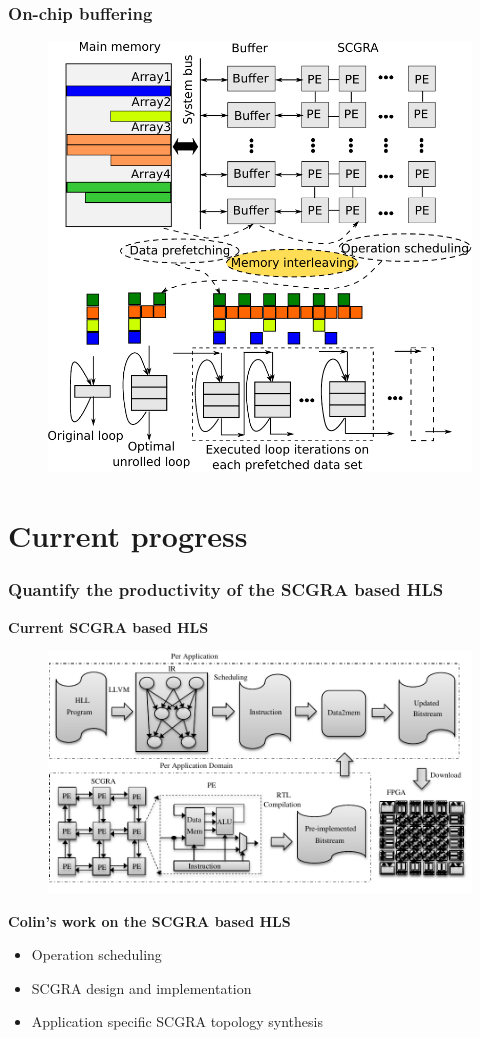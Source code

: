 \documentclass{beamer}
\begin{document}
\begin{frame}[t]
\frametitle{On-chip buffering}

\begin{figure}
\vspace{-1em}
\includegraphics[width=0.7\linewidth]{on-chip-buffer}
\end{figure}

\end{frame}

\section{Current progress}
\begin{frame}[t]
\frametitle{Quantify the productivity of the SCGRA based HLS}
\textbf{Current SCGRA based HLS}
\begin{figure}
\vspace{-1em}
\includegraphics[width=0.85\linewidth]{design-flow}
\vspace{-1em}
\end{figure}

\textbf{Colin's work on the SCGRA based HLS}
\begin{itemize}
\item Operation scheduling
\item SCGRA design and implementation
\item Application specific SCGRA topology synthesis
\end{itemize}

\end{frame}
\end{document}
